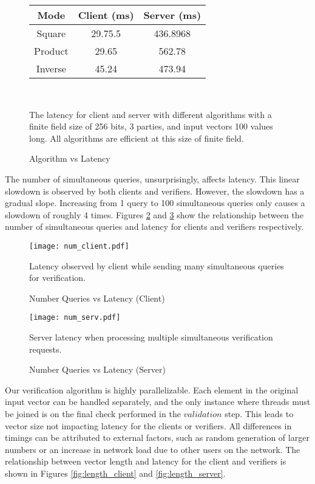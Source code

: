 \documentclass[conference]{IEEEtran}
\begin{document}
\begin{figure}
\begin{center}
\begin{tabular}{|c|c|c|}
\hline
Mode & Client (ms) & Server (ms) \\
\hline
Square & 29.75.5 & 436.8968 \\
Product & 29.65 & 562.78 \\
Inverse & 45.24 & 473.94 \\
\hline
\end{tabular}\\
\caption{Algorithm vs Latency}
\label{fig:alg_table}
\medskip
\small
The latency for client and server with different algorithms with a finite field size of 256 bits, 3 parties, and input vectors 100 values long. All algorithms are efficient at this size of finite field.
\end{center}
\end{figure}


The number of simultaneous queries, unsurprisingly, affects latency. This linear slowdown is observed by both clients and verifiers. However, the slowdown has a gradual slope. Increasing from 1 query to 100 simultaneous queries only causes a slowdown of roughly 4 times. Figures \ref{fig:num_client} and \ref{fig:num_server} show the relationship between the number of simultaneous queries and latency for clients and verifiers respectively.\\

\begin{figure}
\texttt{[image: num\_client.pdf]}\\
\caption{Number Queries vs Latency (Client)}
\label{fig:num_client}
\medskip
\small
Latency observed by client while sending many simultaneous queries for verification.
\end{figure}
\begin{figure}
\texttt{[image: num\_serv.pdf]}\\
\caption{Number Queries vs Latency (Server)}
\label{fig:num_server}
\medskip
\small
Server latency when processing multiple simultaneous verification requests.
\end{figure}




Our verification algorithm is highly parallelizable. Each element in the original input vector can be handled separately, and the only instance where threads must be joined is on the final check performed in the $\textit{validation}$ step. This leads to vector size not impacting latency for the clients or verifiers. All differences in timings can be attributed to external factors, such as random generation of larger numbers or an increase in network load due to other users on the network. The relationship between vector length and latency for the client and verifiers is shown in Figures \ref{fig:length_client} and \ref{fig:length_server}.\\
\end{document}
